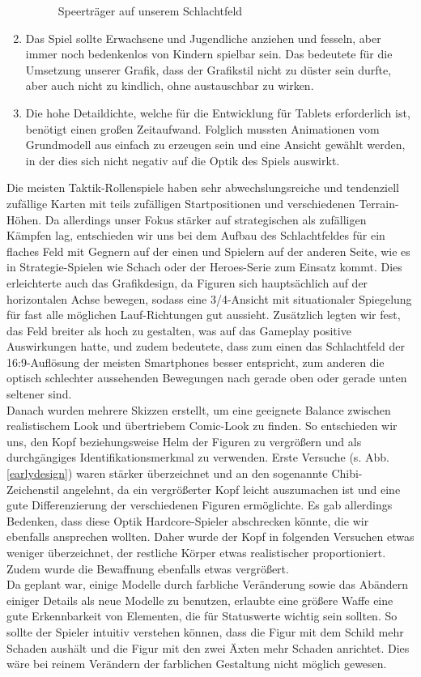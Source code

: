 \documentclass[extern,palatino]{cgBA}
\begin{document}
\begin{enumerate}
\begin{figure}[H]
		\caption{Speerträger auf unserem Schlachtfeld}
		\label{speerkarte}
	\end{figure}
	\item Das Spiel sollte Erwachsene und Jugendliche anziehen und fesseln, aber immer noch bedenkenlos von Kindern spielbar sein. Das bedeutete für die Umsetzung unserer Grafik, dass der Grafikstil nicht zu düster sein durfte, aber auch nicht zu kindlich, ohne austauschbar zu wirken.
	\item Die hohe Detaildichte, welche für die Entwicklung für Tablets erforderlich ist, benötigt einen großen Zeitaufwand. Folglich mussten Animationen vom Grundmodell aus einfach zu erzeugen sein und eine Ansicht gewählt werden, in der dies sich nicht negativ auf die Optik des Spiels auswirkt.
\end{enumerate}
Die meisten Taktik-Rollenspiele haben sehr abwechslungsreiche und tendenziell zufällige Karten mit teils zufälligen Startpositionen und verschiedenen Terrain-Höhen. Da allerdings unser Fokus stärker auf strategischen als zufälligen Kämpfen lag, entschieden wir uns bei dem Aufbau des Schlachtfeldes für ein flaches Feld mit Gegnern auf der einen und Spielern auf der anderen Seite, wie es in Strategie-Spielen wie Schach oder der Heroes-Serie zum Einsatz kommt. Dies erleichterte auch das Grafikdesign, da Figuren sich hauptsächlich auf der horizontalen Achse bewegen, sodass eine 3/4-Ansicht mit situationaler Spiegelung für fast alle möglichen Lauf-Richtungen gut aussieht. Zusätzlich legten wir fest, das Feld breiter als hoch zu gestalten, was auf das Gameplay positive Auswirkungen hatte, und zudem bedeutete, dass zum einen das Schlachtfeld der 16:9-Auflösung der meisten Smartphones besser entspricht, zum anderen die optisch schlechter aussehenden Bewegungen nach gerade oben oder gerade unten seltener sind.
\\Danach wurden mehrere Skizzen erstellt, um eine geeignete Balance zwischen realistischem Look und übertriebem Comic-Look zu finden. So entschieden wir uns, den Kopf beziehungsweise Helm der Figuren zu vergrößern und als durchgängiges Identifikationsmerkmal zu verwenden. Erste Versuche (s. Abb. \ref{earlydesign}) waren stärker überzeichnet und an den sogenannte Chibi-Zeichenstil angelehnt, da ein vergrößerter Kopf leicht auszumachen ist und eine gute Differenzierung der verschiedenen Figuren ermöglichte. Es gab allerdings Bedenken, dass diese Optik Hardcore-Spieler abschrecken könnte, die wir ebenfalls ansprechen wollten. Daher wurde der Kopf in folgenden Versuchen etwas weniger überzeichnet, der restliche Körper etwas realistischer proportioniert. Zudem wurde die Bewaffnung ebenfalls etwas vergrößert. 
\\Da geplant war, einige Modelle durch farbliche Veränderung sowie das Abändern einiger Details als neue Modelle zu benutzen, erlaubte eine größere Waffe eine gute Erkennbarkeit von Elementen, die für Statuswerte wichtig sein sollten. So sollte der Spieler intuitiv verstehen können, dass die Figur mit dem Schild mehr Schaden aushält und die Figur mit den zwei Äxten mehr Schaden anrichtet. Dies wäre bei reinem Verändern der farblichen Gestaltung nicht möglich gewesen.
\end{document}
